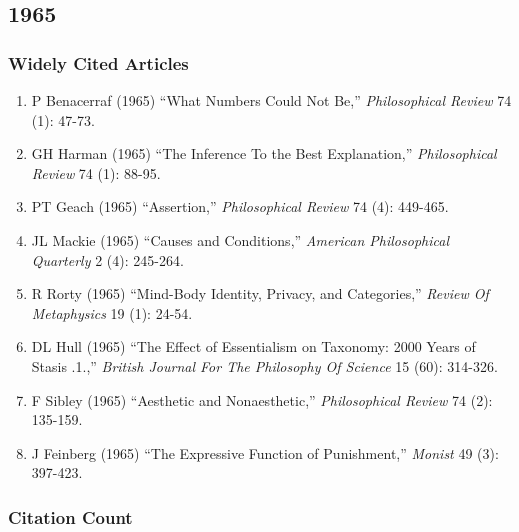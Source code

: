 \documentclass[
  10pt,
  letterpaper,
  DIV=11,
  numbers=noendperiod,
  twoside]{scrartcl}
\providecommand{\tightlist}{%
  \setlength{\itemsep}{0pt}\setlength{\parskip}{0pt}}\usepackage{longtable,booktabs,array}
\begin{document}
\newpage

\subsection{1965}\label{sec-s1965}

\subsubsection*{Widely Cited Articles}\label{widely-cited-articles-9}

\begin{enumerate}
\def\labelenumi{\arabic{enumi}.}
\tightlist
\item
  P Benacerraf (1965) ``What Numbers Could Not Be,'' \emph{Philosophical
  Review} 74 (1): 47-73.
\item
  GH Harman (1965) ``The Inference To the Best Explanation,''
  \emph{Philosophical Review} 74 (1): 88-95.
\item
  PT Geach (1965) ``Assertion,'' \emph{Philosophical Review} 74 (4):
  449-465.
\item
  JL Mackie (1965) ``Causes and Conditions,'' \emph{American
  Philosophical Quarterly} 2 (4): 245-264.
\item
  R Rorty (1965) ``Mind-Body Identity, Privacy, and Categories,''
  \emph{Review Of Metaphysics} 19 (1): 24-54.
\item
  DL Hull (1965) ``The Effect of Essentialism on Taxonomy: 2000 Years of
  Stasis .1.,'' \emph{British Journal For The Philosophy Of Science} 15
  (60): 314-326.
\item
  F Sibley (1965) ``Aesthetic and Nonaesthetic,'' \emph{Philosophical
  Review} 74 (2): 135-159.
\item
  J Feinberg (1965) ``The Expressive Function of Punishment,''
  \emph{Monist} 49 (3): 397-423.
\end{enumerate}

\subsubsection*{Citation Count}\label{sec-count-1965}
\end{document}
